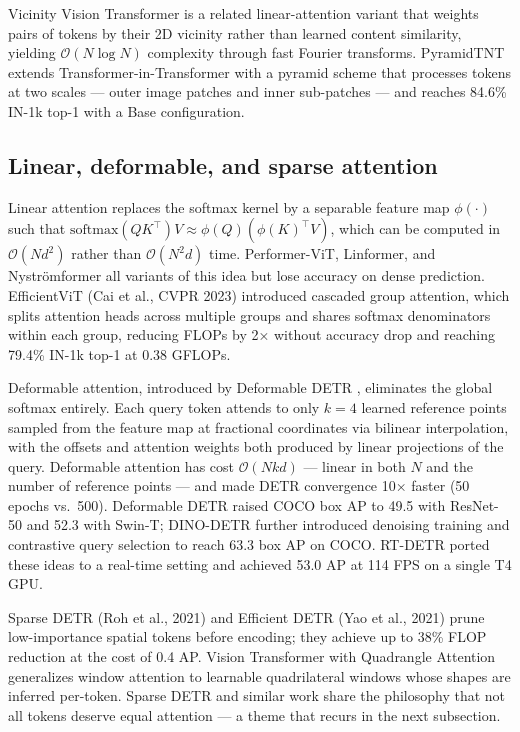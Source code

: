 \documentclass{article}
\begin{document}
Vicinity Vision Transformer \citep{sun2022vicinityvisiontran} is a related linear-attention variant that weights pairs of tokens by their 2D vicinity rather than learned content similarity, yielding \(\mathcal{O}(N \log N)\) complexity through fast Fourier transforms. PyramidTNT \citep{han2022pyramidtntimproved} extends Transformer-in-Transformer with a pyramid scheme that processes tokens at two scales --- outer image patches and inner sub-patches --- and reaches 84.6\% IN-1k top-1 with a Base configuration.

\subsection{Linear, deformable, and sparse attention}\label{linear-deformable-and-sparse-attention}

Linear attention replaces the softmax kernel by a separable feature map \(\phi(\cdot)\) such that \(\mathrm{softmax}(QK^\top)V \approx \phi(Q)(\phi(K)^\top V)\), which can be computed in \(\mathcal{O}(Nd^2)\) rather than \(\mathcal{O}(N^2 d)\) time. Performer-ViT, Linformer, and Nyströmformer all variants of this idea but lose accuracy on dense prediction. EfficientViT (Cai et al., CVPR 2023) introduced cascaded group attention, which splits attention heads across multiple groups and shares softmax denominators within each group, reducing FLOPs by 2× without accuracy drop and reaching 79.4\% IN-1k top-1 at 0.38 GFLOPs.

Deformable attention, introduced by Deformable DETR \citep{zhu2021deformabledetrdefo}, eliminates the global softmax entirely. Each query token attends to only \(k = 4\) learned reference points sampled from the feature map at fractional coordinates via bilinear interpolation, with the offsets and attention weights both produced by linear projections of the query. Deformable attention has cost \(\mathcal{O}(N k d)\) --- linear in both \(N\) and the number of reference points --- and made DETR convergence 10× faster (50 epochs vs.~500). Deformable DETR raised COCO box AP to 49.5 with ResNet-50 and 52.3 with Swin-T; DINO-DETR \citep{zhang2023vitaev2visiontrans} further introduced denoising training and contrastive query selection to reach 63.3 box AP on COCO. RT-DETR \citep{zhao2024detrsbeatyolosonre} ported these ideas to a real-time setting and achieved 53.0 AP at 114 FPS on a single T4 GPU.

Sparse DETR (Roh et al., 2021) and Efficient DETR (Yao et al., 2021) prune low-importance spatial tokens before encoding; they achieve up to 38\% FLOP reduction at the cost of 0.4 AP. Vision Transformer with Quadrangle Attention \citep{zhang2023vitaev2visiontrans} generalizes window attention to learnable quadrilateral windows whose shapes are inferred per-token. Sparse DETR and similar work share the philosophy that not all tokens deserve equal attention --- a theme that recurs in the next subsection.
\end{document}
